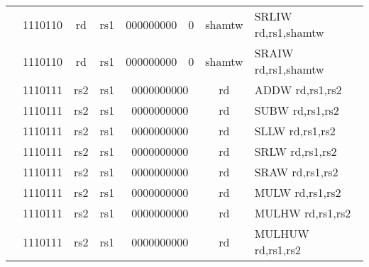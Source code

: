 \begin{table}[p]
\begin{small}
\begin{center}
\begin{tabular}{rcccccccccccl}
&
\multicolumn{2}{|c|}{1110110} &
\multicolumn{1}{c|}{rd} &
\multicolumn{1}{c|}{rs1} &
\multicolumn{5}{c|}{000000000} &
\multicolumn{1}{c|}{0} &
\multicolumn{1}{c|}{shamtw} & SRLIW rd,rs1,shamtw \\
\cline{2-12}
  

&
\multicolumn{2}{|c|}{1110110} &
\multicolumn{1}{c|}{rd} &
\multicolumn{1}{c|}{rs1} &
\multicolumn{5}{c|}{000000000} &
\multicolumn{1}{c|}{0} &
\multicolumn{1}{c|}{shamtw} & SRAIW rd,rs1,shamtw \\
\cline{2-12}
  

&
\multicolumn{2}{|c|}{1110111} &
\multicolumn{1}{c|}{rs2} &
\multicolumn{1}{c|}{rs1} &
\multicolumn{6}{c|}{0000000000} &
\multicolumn{1}{c|}{rd} & ADDW rd,rs1,rs2 \\
\cline{2-12}
  

&
\multicolumn{2}{|c|}{1110111} &
\multicolumn{1}{c|}{rs2} &
\multicolumn{1}{c|}{rs1} &
\multicolumn{6}{c|}{0000000000} &
\multicolumn{1}{c|}{rd} & SUBW rd,rs1,rs2 \\
\cline{2-12}
  

&
\multicolumn{2}{|c|}{1110111} &
\multicolumn{1}{c|}{rs2} &
\multicolumn{1}{c|}{rs1} &
\multicolumn{6}{c|}{0000000000} &
\multicolumn{1}{c|}{rd} & SLLW rd,rs1,rs2 \\
\cline{2-12}
  

&
\multicolumn{2}{|c|}{1110111} &
\multicolumn{1}{c|}{rs2} &
\multicolumn{1}{c|}{rs1} &
\multicolumn{6}{c|}{0000000000} &
\multicolumn{1}{c|}{rd} & SRLW rd,rs1,rs2 \\
\cline{2-12}
  

&
\multicolumn{2}{|c|}{1110111} &
\multicolumn{1}{c|}{rs2} &
\multicolumn{1}{c|}{rs1} &
\multicolumn{6}{c|}{0000000000} &
\multicolumn{1}{c|}{rd} & SRAW rd,rs1,rs2 \\
\cline{2-12}
  

&
\multicolumn{2}{|c|}{1110111} &
\multicolumn{1}{c|}{rs2} &
\multicolumn{1}{c|}{rs1} &
\multicolumn{6}{c|}{0000000000} &
\multicolumn{1}{c|}{rd} & MULW rd,rs1,rs2 \\
\cline{2-12}
  

&
\multicolumn{2}{|c|}{1110111} &
\multicolumn{1}{c|}{rs2} &
\multicolumn{1}{c|}{rs1} &
\multicolumn{6}{c|}{0000000000} &
\multicolumn{1}{c|}{rd} & MULHW rd,rs1,rs2 \\
\cline{2-12}
  

&
\multicolumn{2}{|c|}{1110111} &
\multicolumn{1}{c|}{rs2} &
\multicolumn{1}{c|}{rs1} &
\multicolumn{6}{c|}{0000000000} &
\multicolumn{1}{c|}{rd} & MULHUW rd,rs1,rs2 \\
\cline{2-12}
  


\end{tabular}
\end{center}
\end{small}
\end{table}
